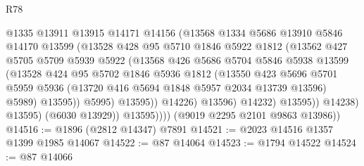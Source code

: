 \begin{lexlean}{R78}
\begin{coremodule}
                              @1335
                              @13911
                              @13915
                              @14171
                              @14156
                              (@13568
                                @1334
                                @5686
                                @13910
                                @5846
                                @14170
                                @13599
                                (@13528
                                  @428
                                  @95
                                  @5710
                                  @1846
                                  @5922
                                  @1812
                                  (@13562
                                    @427
                                    @5705
                                    @5709
                                    @5939
                                    @5922
                                    (@13568
                                      @426
                                      @5686
                                      @5704
                                      @5846
                                      @5938
                                      @13599
                                      (@13528
                                        @424
                                        @95
                                        @5702
                                        @1846
                                        @5936
                                        @1812
                                        (@13550
                                          @423
                                          @5696
                                          @5701
                                          @5959
                                          @5936
                                          (@13720 @416 @5694 @1848 @5957 @2034 @13739 @13596)
                                          @5989)
                                        @13595))
                                    @5995)
                                  @13595))
                              @14226)
                            @13596)
                          @14232)
                        @13595))
                    @14238)
                  @13595)
                (@6030 @13929))
              @13595))))
      (@9019 @2295 @2101 @9863 @13986))
@14516 := @1896 (@2812 @14347) @7891
@14521 := @2023 @14516 @1357 @1399 @1985 @14067
@14522 := @87 @14064
@14523 := @1794 @14522
@14524 := @87 @14066

\end{coremodule}
\end{lexlean}
